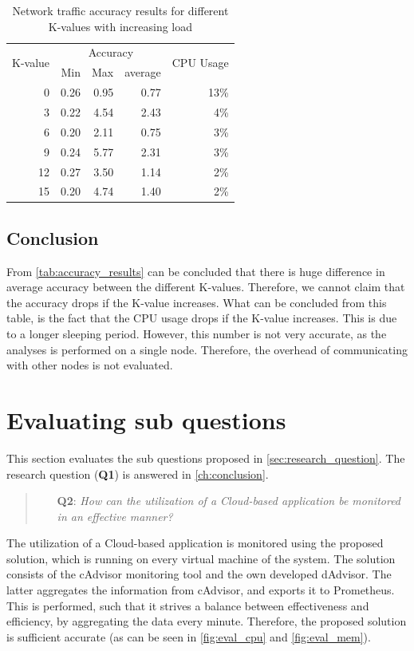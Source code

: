 \begin{table}[ht]
    \centering
    \begin{tabular}{r|rrr|r}
        \multirow{2}{*}{K-value} & \multicolumn{3}{c|}{Accuracy} & \multirow{2}{*}{CPU Usage} \\
        & Min & Max & average & \\ \hline  
        0 & 0.26& 0.95& 0.77& 13\% \\
        3 & 0.22& 4.54& 2.43& 4\% \\
        6 & 0.20& 2.11& 0.75& 3\% \\
        9 & 0.24& 5.77& 2.31& 3\% \\
        12& 0.27& 3.50& 1.14& 2\% \\
        15& 0.20& 4.74& 1.40& 2\% \\        
    \end{tabular}
    \caption{Network traffic accuracy results for different K-values with increasing load}
    \label{tab:accuracy_results}
\end{table}

\subsection{Conclusion} \label{sec:accuracy_conclusion}
From \autoref{tab:accuracy_results} can be concluded that there is huge difference in average accuracy between the different K-values. Therefore, we cannot claim that the accuracy drops if the K-value increases. What can be concluded from this table, is the fact that the CPU usage drops if the K-value increases. This is due to a longer sleeping period. However, this number is not very accurate, as the analyses is performed on a single node. Therefore, the overhead of communicating with other nodes is not evaluated.

\section{Evaluating sub questions}
This section evaluates the sub questions proposed in \autoref{sec:research_question}. The research question (\textbf{Q1}) is answered in \autoref{ch:conclusion}.

\begin{quote}
    \begin{itemize}
        \item[\textbf{Q2}: ]\textit{How can the utilization of a Cloud-based application be monitored in an effective manner?}
    \end{itemize}
\end{quote}
\noindent
The utilization of a Cloud-based application is monitored using the proposed solution, which is running on every virtual machine of the system. The solution consists of the cAdvisor monitoring tool and the own developed dAdvisor. The latter aggregates the information from cAdvisor, and exports it to Prometheus. This is performed, such that it strives a balance between effectiveness and efficiency, by aggregating the data every minute. Therefore, the proposed solution is sufficient accurate (as can be seen in \autoref{fig:eval_cpu} and \autoref{fig:eval_mem}).


